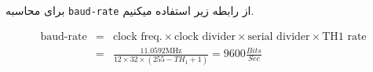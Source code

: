 \documentclass[11pt]{article}
\begin{document}
\begin{qsolve}[]
	 برای محاسبه \texttt{baud-rate} از رابطه زیر استفاده میکنیم.

	 \begin{latin}
		\begin{eqnarray*}
			\text{baud-rate}&=&\text{clock freq.}\times\text{clock divider}
			\times\text{serial divider}\times\text{TH1 rate}\\
			&=& 
			\frac{11.0592\text{MHz}}{12\times32\times(255-TH_1+1)}=9600 \frac{Bits}{Sec}
		\end{eqnarray*}
	\end{latin}
\end{qsolve}
\end{document}
